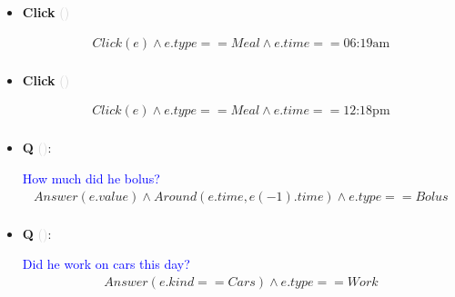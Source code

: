 \documentclass[11pt]{article}
\newcounter{CQ}
\newcounter{CClick}
\newcommand{\key}[1]{\textcolor{lightgray}{#1}}
\begin{document}
\begin{itemize}
	
	\item
	\textbf{Click\theCClick} \key{()} \addtocounter{CClick}{1}
	\begin{multline*}
	Click(e) \wedge e.type == Meal \wedge e.time == \mbox{06:19am} \\
	\end{multline*}
	
	
	\item
	\textbf{Click\theCClick} \key{()} \addtocounter{CClick}{1}
	\begin{multline*}
	Click(e) \wedge e.type == Meal \wedge e.time == \mbox{12:18pm} \\
	\end{multline*}
	

	\item
	\textbf{Q\theCQ} \key{()}: \addtocounter{CQ}{1}
	\textcolor{blue}{ How much did he bolus? }
	\begin{multline*}
	Answer(e.value) \wedge Around(e.time, e(-1).time) \wedge e.type == Bolus \\
	\end{multline*}
	
	
	\item
	\textbf{Q\theCQ} \key{()}: \addtocounter{CQ}{1}
	\textcolor{blue}{ Did he work on cars this day? }
	\begin{multline*}
	Answer(e.kind == Cars) \wedge e.type == Work \\
	\end{multline*}
	
\end{itemize}
\end{document}
